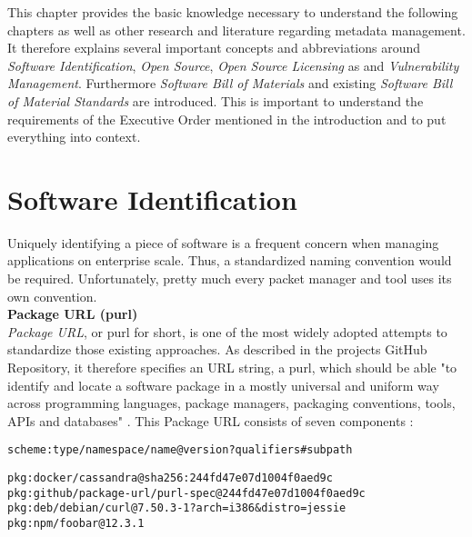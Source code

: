 
 \label{Foundations}
This chapter provides the basic knowledge necessary to understand the following chapters as well as other research and literature regarding metadata management. It therefore explains several important concepts and abbreviations around \textit{Software Identification}, \textit{Open Source}, \textit{Open Source Licensing} as and \textit{Vulnerability Management}. Furthermore \textit{Software Bill of Materials} and existing \textit{Software Bill of Material Standards} are introduced. This is important to understand the requirements of the Executive Order mentioned in the introduction and to put everything into context.

\section{Software Identification}
Uniquely identifying a piece of software is a frequent concern when managing applications on enterprise scale. Thus, a standardized naming convention would be required. Unfortunately, pretty much every packet manager and tool uses its own convention.\\

\noindent
\textbf{Package URL (purl)}\\
\noindent
\textit{Package URL}, or purl for short, is one of the most widely adopted attempts to standardize those existing approaches. As described in the projects GitHub Repository, it therefore specifies an URL string, a purl, which should be able "to identify and locate a software package in a mostly universal and uniform way across programming languages, package managers, packaging conventions, tools, APIs and databases" \cite{purl}. This Package URL consists of seven components \cite{purl}:\\

\begin{lstlisting}[caption=Package URL, captionpos=b, label=lst:Purl]
scheme:type/namespace/name@version?qualifiers#subpath
\end{lstlisting}

\begin{lstlisting}[caption=Package URL Examples, captionpos=b, label=lst:Purl]
pkg:docker/cassandra@sha256:244fd47e07d1004f0aed9c
pkg:github/package-url/purl-spec@244fd47e07d1004f0aed9c
pkg:deb/debian/curl@7.50.3-1?arch=i386&distro=jessie
pkg:npm/foobar@12.3.1
\end{lstlisting}

